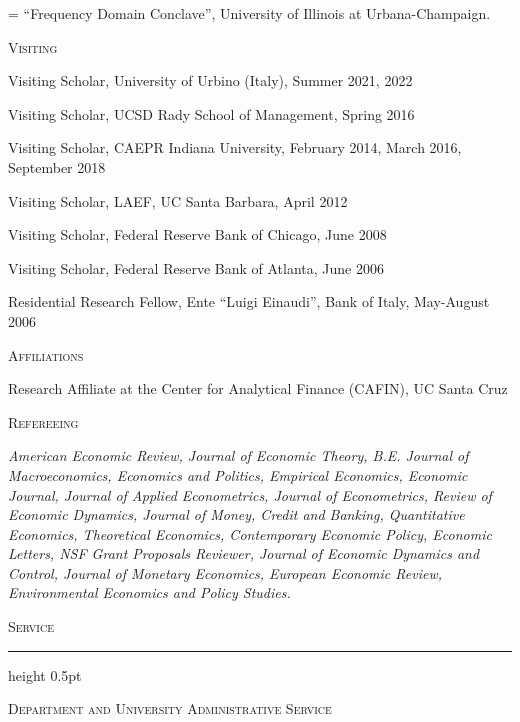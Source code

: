 \documentclass[12pt,letterpaper]{article}
\newcommand{\cvblank}{\par\vspace{11pt}}
\newcommand{\cvsection}[1]{%
  \par\Needspace{5\baselineskip}%
  {\fontsize{13}{14.8}\selectfont\scshape #1\par}%
  \nobreak\vspace{3pt}\hrule height 0.5pt\nobreak\vspace{10pt}}
\newcommand{\cvsubsection}[2][0.125in]{%
  \par\Needspace{4\baselineskip}%
  {\leftskip=#1\relax\scshape #2\par}\nobreak}
\newcommand{\cvtext}[2][0pt]{%
  \par\begingroup\raggedright\leftskip=#1\relax\noindent #2\par\endgroup}
\newcommand{\cvjustify}[2][0.2in]{%
  \par\begingroup\leftskip=#1\relax #2\par\endgroup}
\newlength{\cvyearwidth}
\newcommand{\cvyearentry}[2]{%
  \par\Needspace{2\baselineskip}%
  \begingroup\raggedright\leftskip=\cvyearwidth\relax%
  \noindent\llap{\makebox[\cvyearwidth][l]{#1}}#2\par\endgroup}
\begin{document}
\cvyearentry{2007:}{``Frequency Domain Conclave'', University of Illinois at Urbana-Champaign.}

\cvblank

\cvsubsection[0.125in]{Visiting}

\cvblank

\cvtext[0.2in]{Visiting Scholar, University of Urbino (Italy), Summer 2021, 2022}

\cvtext[0.2in]{Visiting Scholar, UCSD Rady School of Management, Spring 2016}

\cvtext[0.2in]{Visiting Scholar, CAEPR Indiana University, February 2014, March 2016, September 2018}

\cvtext[0.2in]{Visiting Scholar, LAEF, UC Santa Barbara, April 2012}

\cvtext[0.2in]{Visiting Scholar, Federal Reserve Bank of Chicago, June 2008}

\cvtext[0.2in]{Visiting Scholar, Federal Reserve Bank of Atlanta, June 2006}

\cvtext[0.2in]{Residential Research Fellow, Ente ``Luigi Einaudi'', Bank of Italy, May-August 2006}

\cvblank

\cvsubsection[0pt]{Affiliations}

\cvblank

\cvtext[0.2in]{Research Affiliate at the Center for Analytical Finance (CAFIN), UC Santa Cruz}

\cvblank

\cvsubsection[0pt]{Refereeing}

\cvblank

\cvjustify{\textit{American Economic Review, Journal of Economic Theory, B.E. Journal of Macroeconomics, Economics and Politics, Empirical Economics, Economic Journal, Journal of Applied Econometrics, Journal of Econometrics, Review of Economic Dynamics, Journal of Money, Credit and Banking, Quantitative Economics, Theoretical Economics, Contemporary Economic Policy, Economic Letters, NSF Grant Proposals Reviewer, Journal of Economic Dynamics and Control, Journal of Monetary Economics, European Economic Review, Environmental Economics and Policy Studies.}}

\cvblank

\cvblank


\cvsection{Service}

\cvblank

\cvsubsection[0pt]{Department and University Administrative Service}
\end{document}

